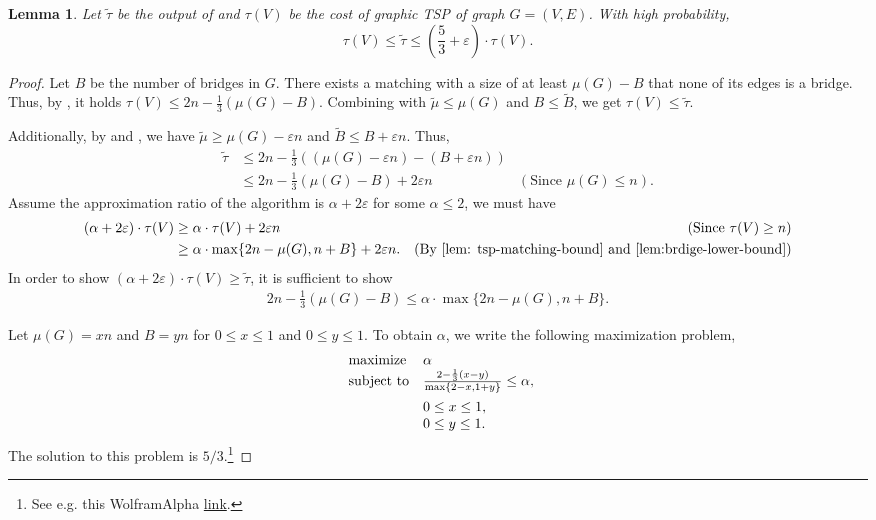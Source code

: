 \documentclass[letterpaper,11pt]{article}
\renewcommand{\epsilon}{\varepsilon}
\newcommand{\tspsize}[1]{\ensuremath{\tau}(#1)}
\newtheorem{lemma}[theorem]{Lemma}
\begin{document}
\begin{lemma}\label{lem: graphic-tsp-approx3}
Let $\tilde{\tau}$ be the output of  and $\tspsize{V}$ be the cost of graphic TSP of graph $G = (V, E)$. With high probability,
$$
\tspsize{V} \leq \tilde{\tau} \leq (\frac{5}{3} + \epsilon) \cdot \tspsize{V}.
$$
\end{lemma}
\begin{proof}
    Let $B$ be the number of bridges in $G$. There exists a matching with a size of at least $\mu(G) - B$ that none of its edges is a bridge. Thus, by , it holds $\tau(V) \leq 2n - \frac{1}{3}(\mu(G) - B)$. Combining with $\tilde\mu \leq \mu(G)$ and $B \leq \tilde B$, we get $\tau(V) \leq \tilde\tau$.

    Additionally, by  and , we have $\tilde \mu \geq \mu(G) - \epsilon n$ and $\tilde B \leq B + \epsilon n$. Thus,
    \begin{align*}
    \tilde{\tau} & \leq 2n - \frac{1}{3}\left( (\mu(G) - \epsilon n) - (B + \epsilon n) \right) \\
    & \leq 2n - \frac{1}{3}(\mu(G) - B) + 2\epsilon n & (\text{Since } \mu(G) \leq n).
    \end{align*}
    Assume the approximation ratio of the algorithm is $\alpha + 2\epsilon$ for some $\alpha \leq 2$, we must have
    \begin{align*}
    (\alpha + 2\epsilon) \cdot \tspsize{V} & \geq \alpha \cdot \tspsize{V} + 2\epsilon n & (\text{Since } \tspsize{V} \geq n) \\ 
    & \geq \alpha\cdot \max\{2n - \mu(G), n + B\} + 2\epsilon n. & (\text{By \Cref{lem: tsp-matching-bound}  and  \Cref{lem:brdige-lower-bound}})
\end{align*}
In order to show $(\alpha + 2\epsilon)\cdot\tspsize{V} \geq \tilde{\tau}$, it is sufficient to show 
\begin{align*}
    2n - \frac{1}{3}(\mu(G) - B) \leq \alpha\cdot \max\{2n - \mu(G), n + B\}.
\end{align*}

Let $\mu(G) = xn$ and $B = yn$ for $0 \leq x \leq 1$ and $ 0\leq y \leq 1$. To obtain $\alpha$, we write the following maximization problem,
\begin{align*}
\begin{array}{ll@{}ll}
\text{maximize}  & \alpha \\
\vspace{5pt}\text{subject to}& \frac{2 - \frac{1}{3}(x - y)}{\max\{2-x, 1+y\}} \leq \alpha,\\
                & 0\leq x \leq 1,\\
                 & 0\leq y \leq 1.
\end{array}
\end{align*}
The solution to this problem is $5/3$.\footnote{See e.g. this WolframAlpha  \href{https://www.wolframalpha.com/input?i=Maximize\%5B\%282-1\%2F3*\%28x+-+y\%29\%29+\%2F+Max\%5B2-x\%2C+1\%2By\%5D\%2C+\%7B0\%3C\%3D+x+\%3C\%3D1\%2C+0\%3C\%3Dy\%3C\%3D1\%7D\%2C+\%7Bx\%2Cy\%7D\%5D}{link}.}
\end{proof}
\end{document}
